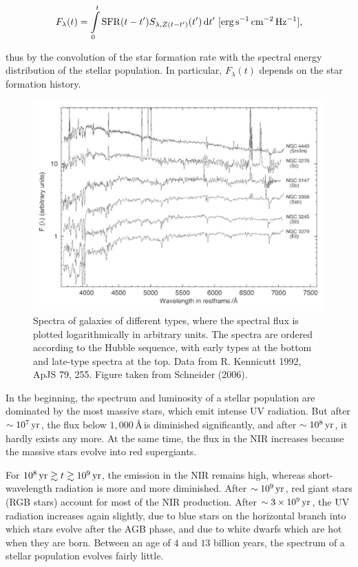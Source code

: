 \documentclass[a4paper,11pt]{article}
\begin{document}
\begin{align*}
    F_\lambda(t) = \int\limits_0^t \mathrm{SFR}(t-t')S_{\lambda,Z(t-t')}(t')\,\mathrm{d}t' ~ [{\rm erg\,s^{-1}\,cm^{-2}\,Hz^{-1}}],
\end{align*}

{\noindent}thus by the convolution of the star formation rate with the spectral energy distribution of the stellar population. In particular, $F_\lambda(t)$ depends on the star formation history.

\begin{figure}[t]
    \includegraphics[width=16cm]{figures/StellarSpectra.png}
    \centering
    \caption{\footnotesize{Spectra of galaxies of different types, where the spectral flux is plotted logarithmically in arbitrary units. The spectra are ordered according to the Hubble sequence, with early types at the bottom and late-type spectra at the top. Data from R. Kennicutt 1992, ApJS 79, 255. Figure taken from Schneider (2006).}}
    \label{fig:stellarspectra}
\end{figure}

{\noindent}In the beginning, the spectrum and luminosity of a stellar population are dominated by the most massive stars, which emit intense UV radiation. But after $\sim10^7\,{\rm yr}$, the flux below $1,000$\,\AA\,is diminished significantly, and after $\sim10^8\,{\rm yr}$, it hardly exists any more. At the same time, the flux in the NIR increases because the massive stars evolve into red supergiants.

{\noindent}For $10^8\,{\rm yr}\gtrsim t\gtrsim10^9\,{\rm yr}$, the emission in the NIR remains high, whereas short-wavelength radiation is more and more diminished. After $\sim10^9\,{\rm yr}$, red giant stars (RGB stars) account for most of the NIR production. After $\sim3\times10^9\,{\rm yr}$, the UV radiation increases again slightly, due to blue stars on the horizontal branch into which stars evolve after the AGB phase, and due to white dwarfs which are hot when they are born. Between an age of $4$ and $13$ billion years, the spectrum of a stellar population evolves fairly little. 
\end{document}
